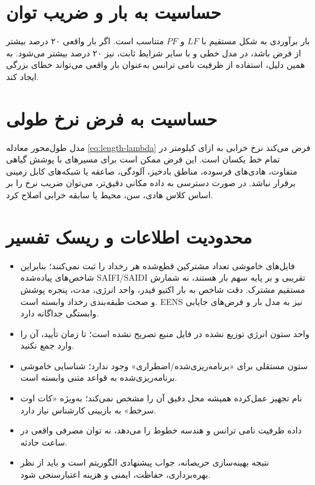 \documentclass[11pt,a4paper,oneside]{book}
\begin{document}
\section{حساسیت به بار و ضریب توان}
بار برآوردی به شکل مستقیم با $LF$ و $PF$ متناسب است. اگر بار واقعی ۲۰ درصد بیشتر از فرض باشد، در مدل خطی و با سایر شرایط ثابت،  نیز ۲۰ درصد بیشتر می‌شود. به همین دلیل، استفاده از ظرفیت نامی ترانس به‌عنوان بار واقعی می‌تواند خطای بزرگی ایجاد کند.

\section{حساسیت به فرض نرخ طولی}
مدل طول‌محور معادله \eqref{eq:length-lambda} فرض می‌کند نرخ خرابی به ازای کیلومتر در تمام خط یکسان است. این فرض ممکن است برای مسیرهای با پوشش گیاهی متفاوت، هادی‌های فرسوده، مناطق بادخیز، آلودگی، صاعقه یا شبکه‌های کابل زمینی برقرار نباشد. در صورت دسترسی به داده مکانی دقیق‌تر، می‌توان ضریب نرخ را بر اساس کلاس هادی، سن، محیط یا سابقه خرابی اصلاح کرد.

\section{محدودیت اطلاعات و ریسک تفسیر}
\begin{itemize}
\item فایل‌های خاموشی تعداد مشترکین قطع‌شده هر رخداد را ثبت نمی‌کنند؛ بنابراین شاخص‌های پیاده‌شده SAIFI/SAIDI تقریبی و بر پایه سهم بار هستند، نه شمارش مستقیم مشترک. دقت شاخص به بار اکتیو فیدر، واحد انرژی، مدت، پنجره پوشش و صحت طبقه‌بندی رخداد وابسته است. EENS نیز به مدل بار و فرض‌های جایابی وابستگی جداگانه دارد.
\item واحد ستون انرژي توزيع نشده در فایل منبع تصریح نشده است؛ تا زمان تأیید، آن را وارد جمع  نکنید.
\item ستون مستقلی برای «برنامه‌ریزی‌شده/اضطراری» وجود ندارد؛ شناسایی خاموشی برنامه‌ریزی‌شده به قواعد متنی وابسته است.
\item نام تجهیز عمل‌کرده همیشه محل دقیق آن را مشخص نمی‌کند؛ به‌ویژه «کات اوت سرخط» به بازبینی کارشناس نیاز دارد.
\item داده  ظرفیت نامی ترانس و هندسه خطوط را می‌دهد، نه توان مصرفی واقعی در ساعت حادثه.
\item نتیجه بهینه‌سازی حریصانه، جواب پیشنهادی الگوریتم است و باید از نظر بهره‌برداری، حفاظت، ایمنی و هزینه اعتبارسنجی شود.
\end{itemize}
\end{document}
